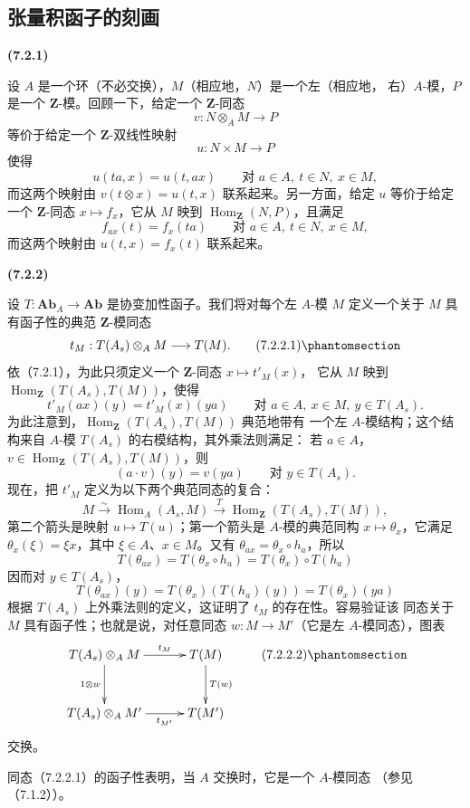 \documentclass[UTF8,fontset=none,11pt,oneside,openany]{ctexbook}
\newenvironment{env}[1][]{%
  \par\medskip\noindent\textbf{(#1)}\ %
}{\par}
\newcommand{\oldpage}[2][]{%
  \hypertarget{ega-source-page-#1-#2}{}%
  \marginnote{\scriptsize\textbf{#1}~|~#2}\ignorespaces}
\let\EGAOriginalLabel\label
\renewcommand{\label}[1]{\phantomsection\EGAOriginalLabel{#1}}
\begin{document}
\subsection{张量积函子的刻画}
\label{subsection:III.7.2.fr}

\begin{env}[7.2.1]
设 $A$ 是一个环（不必交换），$M$（相应地，$N$）是一个左（相应地，
右）$A$-模，$P$ 是一个 $\mathbf Z$-模。回顾一下，给定一个
$\mathbf Z$-同态
\[
  v:N\otimes_A M\longrightarrow P
\]
等价于给定一个 $\mathbf Z$-双线性映射
\[
  u:N\times M\longrightarrow P
\]
使得
\[
  u(ta,x)=u(t,ax)
  \qquad\text{对 }a\in A,\ t\in N,\ x\in M,
\]
而这两个映射由 $v(t\otimes x)=u(t,x)$ 联系起来。另一方面，给定 $u$
等价于给定一个
\oldpage[III]{177}
$\mathbf Z$-同态 $x\mapsto f_x$，它从 $M$ 映到
$\operatorname{Hom}_{\mathbf Z}(N,P)$，且满足
\[
  f_{ax}(t)=f_x(ta)
  \qquad\text{对 }a\in A,\ t\in N,\ x\in M,
\]
而这两个映射由 $u(t,x)=f_x(t)$ 联系起来。
\end{env}

\begin{env}[7.2.2]
设 $T:\mathbf{Ab}_A\to\mathbf{Ab}$ 是协变加性函子。我们将对每个左
$A$-模 $M$ 定义一个关于 $M$ 具有函子性的典范 $\mathbf Z$-模同态
\[
  t_M:T(A_s)\otimes_A M\longrightarrow T(M).
  \tag{7.2.2.1}\label{III.7.2.2.1.fr}
\]
依（7.2.1），为此只须定义一个 $\mathbf Z$-同态 $x\mapsto t'_M(x)$，
它从 $M$ 映到 $\operatorname{Hom}_{\mathbf Z}(T(A_s),T(M))$，使得
\[
  t'_M(ax)(y)=t'_M(x)(ya)
  \qquad\text{对 }a\in A,\ x\in M,\ y\in T(A_s).
\]
为此注意到，$\operatorname{Hom}_{\mathbf Z}(T(A_s),T(M))$ 典范地带有
一个左 $A$-模结构；这个结构来自 $A$-模 $T(A_s)$ 的右模结构，其外乘法则满足：
若 $a\in A$，$v\in\operatorname{Hom}_{\mathbf Z}(T(A_s),T(M))$，则
\[
  (a\cdot v)(y)=v(ya)
  \qquad\text{对 }y\in T(A_s).
\]
现在，把 $t'_M$ 定义为以下两个典范同态的复合：
\[
  M\xrightarrow{\sim}\operatorname{Hom}_A(A_s,M)
  \xrightarrow{T}
  \operatorname{Hom}_{\mathbf Z}(T(A_s),T(M)),
\]
第二个箭头是映射 $u\mapsto T(u)$；第一个箭头是 $A$-模的典范同构
$x\mapsto\theta_x$，它满足 $\theta_x(\xi)=\xi x$，其中
$\xi\in A$、$x\in M$。又有 $\theta_{ax}=\theta_x\circ h_a$，所以
\[
  T(\theta_{ax})
  =
  T(\theta_x\circ h_a)
  =
  T(\theta_x)\circ T(h_a)
\]
因而对 $y\in T(A_s)$，
\[
  T(\theta_{ax})(y)
  =
  T(\theta_x)(T(h_a)(y))
  =
  T(\theta_x)(ya)
\]
根据 $T(A_s)$ 上外乘法则的定义，这证明了 $t_M$ 的存在性。容易验证该
同态关于 $M$ 具有函子性；也就是说，对任意同态 $w:M\to M'$（它是左
$A$-模同态），图表
\[
\xymatrix@C=30pt@R=30pt{
  T(A_s)\otimes_A M
  \ar[r]^-{t_M}\ar[d]_{1\otimes w}
  &
  T(M)\ar[d]^{T(w)}
  \\
  T(A_s)\otimes_A M'
  \ar[r]_-{t_{M'}}
  &
  T(M')
}
\tag{7.2.2.2}\label{III.7.2.2.2.fr}
\]
交换。

同态（7.2.2.1）的函子性表明，当 $A$ 交换时，它是一个 $A$-模同态
（参见（7.1.2））。
\end{env}
\end{document}
